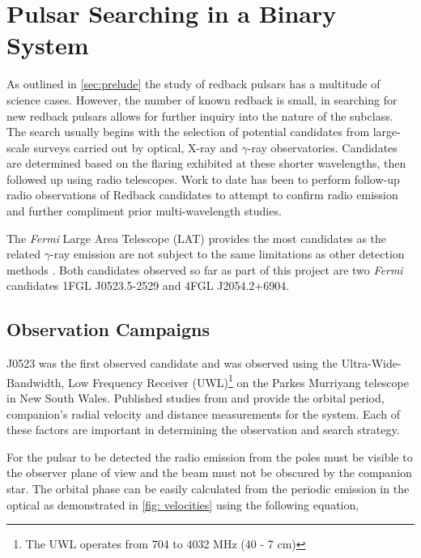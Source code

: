 \newpage
\section{Pulsar Searching in a Binary System} \label{sec:method-pulsar-searching}

As outlined in \cref{sec:prelude} the study of redback pulsars has a multitude of science cases. However, the number of known redback is small, in searching for new redback pulsars allows for further inquiry into the nature of the subclass. The search usually begins with the selection of potential candidates from large-scale surveys carried out by optical, X-ray and $\gamma$-ray observatories. Candidates are determined based on the flaring exhibited at these shorter wavelengths, then followed up using radio telescopes. Work to date has been to perform follow-up radio observations of Redback candidates to attempt to confirm radio emission and further compliment prior multi-wavelength studies. \

The \textit{Fermi} Large Area Telescope (LAT) provides the most candidates as the related $\gamma$-ray emission are not subject to the same limitations as other detection methods \citep{ray_radio_2012}. Both candidates observed so far as part of this project are two \textit{Fermi} candidates 1FGL J0523.5-2529 and 4FGL J2054.2+6904. 

\subsection{Observation Campaigns}

J0523 was the first observed candidate and was observed using the Ultra-Wide-Bandwidth, Low Frequency Receiver (UWL)\footnote{The UWL operates from 704 to 4032 MHz (40 - 7 cm)} on the Parkes Murriyang telescope in New South Wales. Published studies from \cite{strader_1fgl_2014} and \cite{halpern_luminous_2022} provide the orbital period, companion's radial velocity and distance measurements for the system. Each of these factors are important in determining the observation and search strategy. \ 

For the pulsar to be detected the radio emission from the poles must be visible to the observer plane of view and the beam must not be obscured by the companion star. The orbital phase can be easily calculated from the periodic emission in the optical as demonstrated in \cref{fig: velocities} using the following equation, 

